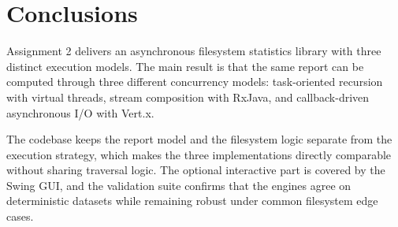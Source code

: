 \clearpage
\section{Conclusions}

Assignment 2 delivers an asynchronous filesystem statistics library
with three distinct execution models. The main result is that the same report
can be computed through three different concurrency models:
task-oriented recursion with virtual threads, stream composition with RxJava,
and callback-driven asynchronous I/O with Vert.x.

The codebase keeps the report model and the filesystem logic separate from the
execution strategy, which makes the three implementations directly comparable
without sharing traversal logic. The optional interactive part is covered by
the Swing GUI, and the validation suite confirms that the engines agree on
deterministic datasets while remaining robust under common filesystem edge
cases.
